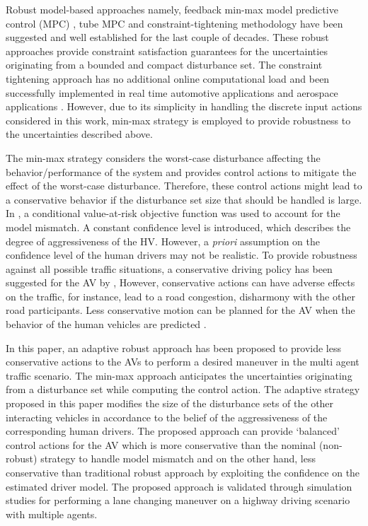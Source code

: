 \documentclass[10pt,journal]{IEEEtran}
\begin{document}
	
	Robust model-based approaches namely, feedback min-max model predictive control (MPC) \cite{Scokaert1998}, tube MPC \cite{Mayne2005} and constraint-tightening methodology \cite{Richards2003} have been suggested and well established for the last couple of decades. These robust approaches provide constraint satisfaction guarantees for the uncertainties originating from a bounded and compact disturbance set. The constraint tightening approach has no additional online computational load and been successfully implemented in real time automotive applications \cite{Sankar2019, Sankar2019a} and aerospace applications \cite{Richards2003}. However, due to its simplicity in handling the discrete input actions considered in this work, min-max strategy is employed to provide robustness to the uncertainties described above. 

	The min-max strategy considers the worst-case disturbance affecting the behavior/performance of the system and provides control actions to mitigate the effect of the worst-case disturbance. Therefore, these control actions might lead to a conservative behavior if the disturbance set size that should be handled is large. In \cite{Jin2019}, a conditional value-at-risk objective function was used to account for the model mismatch. A constant confidence level is introduced, which describes the degree of aggressiveness of the HV. However, a \textit{priori} assumption on the confidence level of the human drivers may not be realistic. To provide robustness against all possible traffic situations, a conservative driving policy has been suggested for the AV by \cite{Claussmann2015, Brechtel2014}, However, conservative actions can have adverse effects on the traffic, for instance, lead to a road congestion, disharmony with the other road participants. Less conservative motion can be planned for the AV  when the behavior of the human vehicles are predicted \cite{Sadigh2016}.
	
	
	In this paper, an adaptive robust approach has been proposed to provide less conservative actions to the AVs to perform a desired maneuver in the multi agent traffic scenario. The min-max approach anticipates the uncertainties originating from a disturbance set while computing the control action. The adaptive strategy proposed in this paper modifies the size of the disturbance sets of the other interacting vehicles in accordance to the belief of the aggressiveness of the corresponding human drivers. The proposed approach can provide `balanced' control actions for the AV which is more conservative than the nominal (non-robust) strategy to handle model mismatch and on the other hand, less conservative than traditional robust approach by exploiting the confidence on the estimated driver model. The proposed approach is validated through simulation studies for performing a lane changing maneuver on a highway driving scenario with multiple agents.
	
\end{document}
